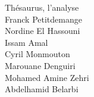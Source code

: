 \documentclass[a4paper, 12pt]{report}
\begin{document}
\begin{titlepage}
	\vspace*{\fill}
	\begin{center}
		{\Huge Thésaurus, l'analyse}\\
		\vspace{\fill}
		Franck Petitdemange \\
		Nordine El Hassouni \\
		Issam Amal \\
		Cyril Monmouton \\
		Marouane Denguiri \\
		Mohamed Amine Zehri \\
		Abdelhamid Belarbi
	\end{center}
	\vspace*{\fill}
	\center{\today}
\end{titlepage}
\end{document}
